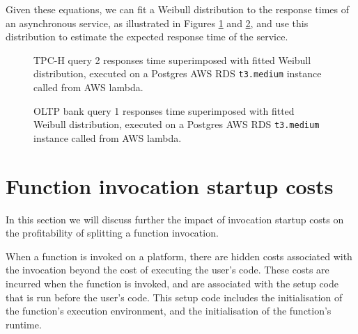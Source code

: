 Given these equations, we can fit a Weibull distribution to the response times of an asynchronous service, as illustrated in Figures \ref{fig:tpch-q2-weibull} and \ref{fig:oltp-q1-weibull}, and use this distribution to estimate the expected response time of the service.

%        

\begin{figure}
    \begin{center}
        
    \end{center}
    \caption{TPC-H query 2 responses time superimposed with fitted Weibull distribution, executed on a Postgres AWS RDS \texttt{t3.medium} instance called from AWS lambda.}
    \label{fig:tpch-q2-weibull}
\end{figure}

\begin{figure}
    \begin{center}
        
    \end{center}
    \caption{OLTP bank query 1 responses time superimposed with fitted Weibull distribution, executed on a Postgres AWS RDS \texttt{t3.medium} instance called from AWS lambda.}
    \label{fig:oltp-q1-weibull}
\end{figure}

\section{Function invocation startup costs}
\label{sec:faas-function-invocation-startup-costs}
In this section we will discuss further the impact of invocation startup costs on the profitability of splitting a function invocation.

When a function is invoked on a \faas{} platform, there are hidden costs associated with the invocation beyond the cost of executing the user's code. These costs are incurred when the function is invoked, and are associated with the setup code that is run before the user's code. This setup code includes the initialisation of the function's execution environment, and the initialisation of the function's runtime.

